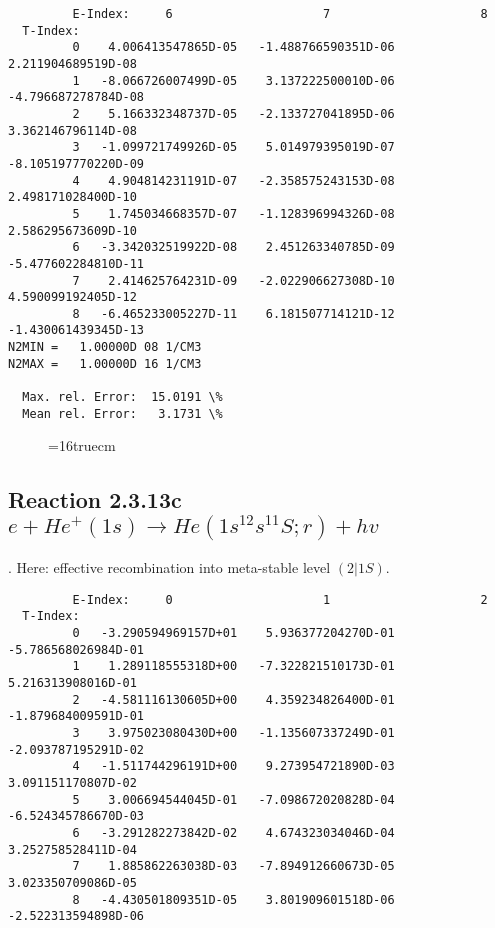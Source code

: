 \documentclass[12pt,dvipdfmx]{article}
\begin{document}
{\begin{small}
\begin{verbatim}
         E-Index:     6                     7                     8
  T-Index:
         0    4.006413547865D-05   -1.488766590351D-06    2.211904689519D-08
         1   -8.066726007499D-05    3.137222500010D-06   -4.796687278784D-08
         2    5.166332348737D-05   -2.133727041895D-06    3.362146796114D-08
         3   -1.099721749926D-05    5.014979395019D-07   -8.105197770220D-09
         4    4.904814231191D-07   -2.358575243153D-08    2.498171028400D-10
         5    1.745034668357D-07   -1.128396994326D-08    2.586295673609D-10
         6   -3.342032519922D-08    2.451263340785D-09   -5.477602284810D-11
         7    2.414625764231D-09   -2.022906627308D-10    4.590099192405D-12
         8   -6.465233005227D-11    6.181507714121D-12   -1.430061439345D-13
N2MIN =   1.00000D 08 1/CM3
N2MAX =   1.00000D 16 1/CM3

  Max. rel. Error:  15.0191 \%
  Mean rel. Error:   3.1731 \%

\end{verbatim}\end{small}
\begin{figure} \label{2.3.13b}
\epsfxsize=16truecm
\end{figure}
\newpage

\subsection{
Reaction 2.3.13c $ e + He^+(1s) \rightarrow He(1s^12s^11S;r) + hv$
}

\cite{kn:Fujimoto}. Here: effective recombination into meta-stable level
$(2|1S)$.

\begin{small}\begin{verbatim}
         E-Index:     0                     1                     2
  T-Index:
         0   -3.290594969157D+01    5.936377204270D-01   -5.786568026984D-01
         1    1.289118555318D+00   -7.322821510173D-01    5.216313908016D-01
         2   -4.581116130605D+00    4.359234826400D-01   -1.879684009591D-01
         3    3.975023080430D+00   -1.135607337249D-01   -2.093787195291D-02
         4   -1.511744296191D+00    9.273954721890D-03    3.091151170807D-02
         5    3.006694544045D-01   -7.098672020828D-04   -6.524345786670D-03
         6   -3.291282273842D-02    4.674323034046D-04    3.252758528411D-04
         7    1.885862263038D-03   -7.894912660673D-05    3.023350709086D-05
         8   -4.430501809351D-05    3.801909601518D-06   -2.522313594898D-06


\end{verbatim}
\end{small}}
\end{document}
